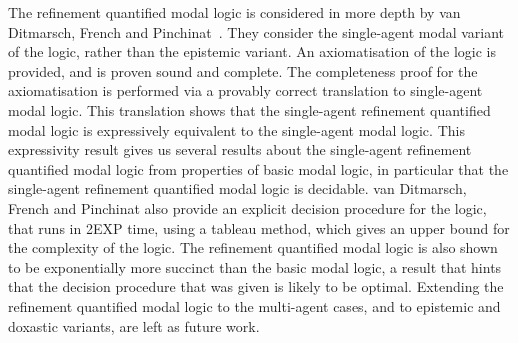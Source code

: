 The refinement quantified modal logic is considered in more depth by van
Ditmarsch, French and Pinchinat~\cite{french2010future}. They consider the
single-agent modal variant of the logic, rather than the epistemic variant. An
axiomatisation of the logic is provided, and is proven sound and complete. The
completeness proof for the axiomatisation is performed via a provably correct
translation to single-agent modal logic. This translation shows that the
single-agent refinement quantified modal logic is expressively equivalent to the
single-agent modal logic. This expressivity result gives us several results
about the single-agent refinement quantified modal logic from properties of
basic modal logic, in particular that the single-agent refinement quantified
modal logic is decidable. van Ditmarsch, French and Pinchinat also provide an
explicit decision procedure for the logic, that runs in 2EXP time, using a
tableau method, which gives an upper bound for the complexity of the logic. The
refinement quantified modal logic is also shown to be exponentially more
succinct than the basic modal logic, a result that hints that the decision
procedure that was given is likely to be optimal. Extending the refinement
quantified modal logic to the multi-agent cases, and to epistemic and doxastic
variants, are left as future work.
